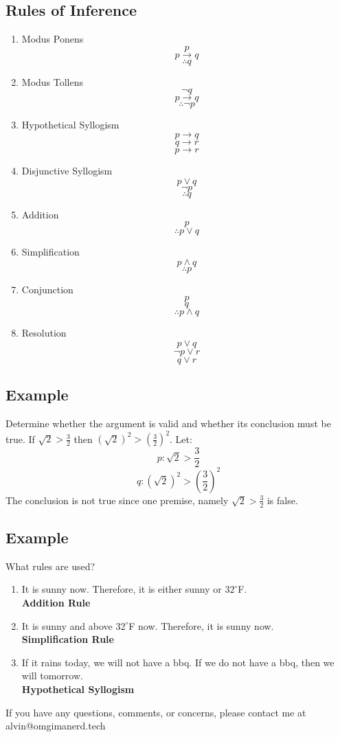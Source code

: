 \documentclass[letterpaper, 12pt]{math}
\begin{document}
\subsection*{Rules of Inference}
\begin{enumerate}
  \item Modus Ponens
    \[ p \]
    \[ p \to q \]
    \[ \therefore q\]
  \item Modus Tollens
    \[ \neg{q} \]
    \[ p \to q \]
    \[ \therefore \neg{p} \]
  \item Hypothetical Syllogism
    \[ p \to q \]
    \[ q \to r \]
    \[ p \to r \]
  \item Disjunctive Syllogism
    \[ p \vee q \]
    \[ \neg{p} \]
    \[ \therefore q \]
  \item Addition
    \[ p \]
    \[ \therefore p \vee q \]
  \item Simplification
    \[ p \wedge q \]
    \[ \therefore p \]
  \item Conjunction
    \[ p \]
    \[ q \]
    \[ \therefore p \wedge q \]
  \item Resolution
    \[ p \vee q \]
    \[ \neg{p} \vee r \]
    \[ q \vee r \]
\end{enumerate}

\subsection*{Example}
Determine whether the argument is valid and whether its conclusion must be true.
If \( \sqrt{2} > \frac{3}{2} \) then \( (\sqrt{2})^{2} > (\frac{3}{2})^{2} \).
Let:
\[ p: \sqrt{2} > \frac{3}{2} \]
\[ q: (\sqrt{2})^{2} > (\frac{3}{2})^{2} \]
The conclusion is not true since one premise, namely
\( \sqrt{2} > \frac{3}{2} \) is false.

\subsection*{Example}
What rules are used?
\begin{enumerate}
  \item It is sunny now. Therefore, it is either sunny or \( 32^{\circ} \)F. \\
    \textbf{Addition Rule}
  \item It is sunny and above \( 32^{\circ} \)F now. Therefore, it is sunny
    now. \\
    \textbf{Simplification Rule}
  \item If it rains today, we will not have a bbq. If we do not have a bbq,
    then we will tomorrow. \\
    \textbf{Hypothetical Syllogism}
\end{enumerate}

\begin{center}
  If you have any questions, comments, or concerns, please contact me at
  alvin@omgimanerd.tech
\end{center}
\end{document}
